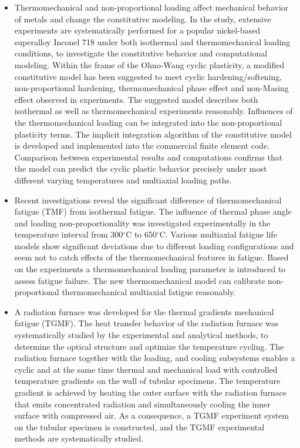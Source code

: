 \begin{itemize}

\item Thermomechanical and non-proportional loading affect mechanical behavior of metals and change the constitutive modeling. In the study, extensive experiments are systematically performed for a popular nickel-based superalloy Inconel 718 under both isothermal and thermomechanical loading conditions, to investigate the constitutive behavior and computational modeling. Within the frame of the Ohno-Wang cyclic plasticity, a modified constitutive model has been suggested to meet cyclic hardening/softening, non-proportional hardening, thermomechanical phase effect and non-Masing effect observed in experiments. The suggested model describes both isothermal as well as thermomechanical experiments reasonably. Influences of the thermomechanical loading can be integrated into the non-proportional plasticity terms. The implicit integration algorithm of the constitutive model is developed and implemented into the commercial finite element code. Comparison between experimental results and computations confirms that the model can predict the cyclic plastic behavior precisely under most different varying temperatures and multiaxial loading paths.

\item Recent investigations reveal the significant difference of thermomechanical fatigue (TMF) from isothermal fatigue. The influence of thermal phase angle and loading non-proportionality was investigated experimentally in the temperature interval from 300$^\circ$C to 650$^\circ$C. Various multiaxial fatigue life models show significant deviations due to different loading configurations and seem not to catch effects of the thermomechanical features in fatigue. Based on the experiments a thermomechanical loading parameter is introduced to assess fatigue failure. The new thermomechanical model can calibrate non-proportional thermomechanical multiaxial fatigue reasonably.

\item A radiation furnace was developed for the thermal gradients mechanical fatigue (TGMF). The heat transfer behavior of the radiation furnace was systematically studied by the experimental and analytical methods, to determine the optical structure and optimize the temperature cycling. The radiation furnace together with the loading, and cooling subsystems enables a cyclic and at the same time thermal and mechanical load with controlled temperature gradients on the wall of tubular specimens. The temperature gradient is achieved by heating the outer surface with the radiation furnace that emits concentrated radiation and simultaneously cooling the inner surface with compressed air. As a consequence, a TGMF experiment system on the tubular specimen is constructed, and the TGMF experimental methods are systematically studied. 


\end{itemize}

